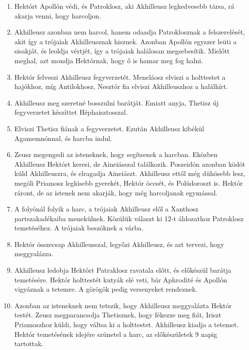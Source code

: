 \documentclass[]{article}
\begin{document}
\begin{enumerate}
				\item Hektórt Apollón védi, és Patroklosz, aki Akhilleusz legkedvesebb társa, rá akarja venni, hogy harcoljon.
				
				\item Akhilleusz azonban nem harcol, hanem odaadja Patroklosznak a felszerelését, akit így a trójaiak Akhilleusznak hisznek. Azonban Apollón egyszer leüti a sisakját, és leoldja vértjét, így a trójaiak halálosan megsebesítik. Mielőtt meghal, azt mondja Hektórnak, hogy ő is hamar meg fog halni.
				
				\item Hektór felveszi Akhilleusz fegyverzetét. Meneláosz elviszi a holttestet a hajókhoz, míg Antilokhosz, Nesztór fia elviszi Akhilleuszhoz a halálhírt.
				
				\item Akhilleusz meg szeretné bosszulni barátját. Emiatt anyja, Thetisz új fegyverzetet készíttet Héphaisztosszal.
				
				\item Elviszi Thetisz fiának a fegyverzetet. Ezután Akhilleusz kibékül Agamemnónnal, és harcba indul.
				
				\item Zeusz megengedi az isteneknek, hogy segítsenek a harcban. Eközben Akhilleusz Hektórt keresi, de Aineiásszal találkozik. Poszeidón azonban ködöt küld Akhilleuszra, és elragadja Aineiászt. Akhilleusz ettől még dühösebb lesz, megöli Priamosz legkisebb gyerekét, Hektór öccsét, és Polüdoroszt is. Hektór ráront, de az istenek nem akarják, hogy még harcoljanak egymással.
				
				\item A folyónál folyik a harc, a trójaiak Akhilleusz elől a Xanthosz partszakadékaiba menekülnek. Közülük választ ki 12-t áldozathoz Patroklosz temetéséhez. A trójaiak beszöknek a várba.
				
				\item Hektór összecsap Akhilleusszal, legyőzi Akhilleusz, és azt tervezi, hogy meggyalázza.
				
				\item Akhilleusz ledobja Hektórt Patraklosz ravatala előtt, és előkészül barátja temetésére. Hektór holttestét kutyák elé veti, bár Aphrodité és Apollón vigyáznak a tetemre. A görögök pedig versenyeket rendeznek.
				
				\item Azonban az isteneknek nem tetszik, hogy Akhilleusz meggyalázta Hektór testét. Zeusz megparancsolja Thetisznek, hogy fékezze meg fiát, Iriszt Priamoszhoz küldi, hogy váltsa ki a holttestet. Akhilleusz kiadja a tetemet. Hektór temetésének idejére szünetel a harc, az előkészületek 9 napig tartottak. 
			\end{enumerate}
			\cite{WIliasz_en}
			\cite{Iliasz_tartalom}
			\pagebreak
\end{document}
